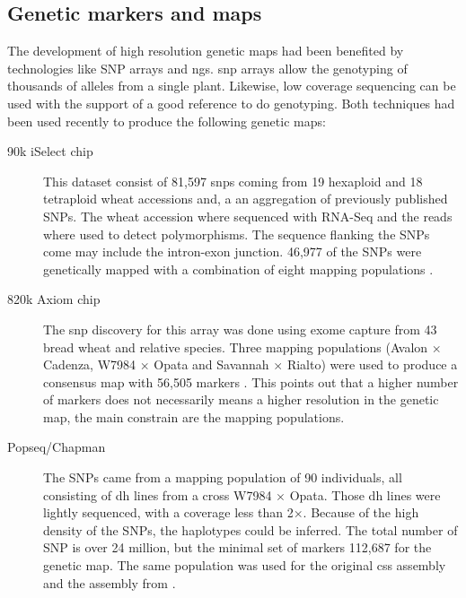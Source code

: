 \subsection{Genetic markers and maps}

The development of high resolution genetic maps had been benefited by technologies like SNP arrays and \gls{ngs}. 
\gls{snp} arrays allow the genotyping of thousands of alleles from a single plant. Likewise, low coverage sequencing can be used with the support of a good reference to do genotyping. 
Both techniques had been used recently to produce the following genetic maps: 

\begin{description}
\item[90k iSelect chip] This dataset consist of 81,597 \glspl{snp} coming from 19 hexaploid and 18 tetraploid wheat accessions and, a an aggregation of previously published SNPs. The wheat accession where sequenced with RNA-Seq and the reads where used to detect polymorphisms. The sequence flanking the SNPs come may include the intron-exon junction. 46,977 of the SNPs were genetically mapped with a combination of eight mapping populations \citep{Wang2014}. 
\item[820k Axiom chip] The \gls{snp} discovery for this array was done using exome capture from 43 bread wheat and relative species. Three mapping populations (Avalon $\times$ Cadenza, W7984 $\times$ Opata and Savannah $\times$  Rialto) were used to produce a consensus map with 56,505 markers \citep{Allen2016,Winfield2016}. This points out that a higher number of markers does not necessarily means a higher resolution in the genetic map, the main constrain are the mapping populations.  
\item[Popseq/Chapman] The SNPs came from a mapping population of 90 individuals, all consisting of \gls{dh} lines from a cross W7984 $\times$ Opata. Those \gls{dh} lines were lightly sequenced, with a coverage less than 2$\times$. Because of the high density of the SNPs, the haplotypes could be inferred. The total number of SNP is over 24 million, but the minimal set of markers 112,687 for the genetic map. The same population was used for the original \gls{css} assembly \citep{Mayer2014} and the assembly from \citet{Chapman2015}. 
\end{description}



